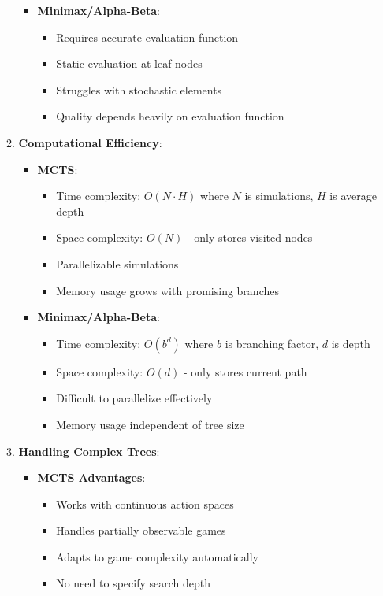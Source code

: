 \begin{itemize}
\begin{enumerate}
\begin{itemize}
            \item \textbf{Minimax/Alpha-Beta}:
            \begin{itemize}
                \item Requires accurate evaluation function
                \item Static evaluation at leaf nodes
                \item Struggles with stochastic elements
                \item Quality depends heavily on evaluation function
            \end{itemize}
        \end{itemize}
        
        \item \textbf{Computational Efficiency}:
        \begin{itemize}
            \item \textbf{MCTS}: 
            \begin{itemize}
                \item Time complexity: $O(N \cdot H)$ where $N$ is simulations, $H$ is average depth
                \item Space complexity: $O(N)$ - only stores visited nodes
                \item Parallelizable simulations
                \item Memory usage grows with promising branches
            \end{itemize}
            
            \item \textbf{Minimax/Alpha-Beta}:
            \begin{itemize}
                \item Time complexity: $O(b^d)$ where $b$ is branching factor, $d$ is depth
                \item Space complexity: $O(d)$ - only stores current path
                \item Difficult to parallelize effectively
                \item Memory usage independent of tree size
            \end{itemize}
        \end{itemize}
        
        \item \textbf{Handling Complex Trees}:
        \begin{itemize}
            \item \textbf{MCTS Advantages}:
            \begin{itemize}
                \item Works with continuous action spaces
                \item Handles partially observable games
                \item Adapts to game complexity automatically
                \item No need to specify search depth
            \end{itemize}
            

\end{itemize}
\end{enumerate}
\end{itemize}

